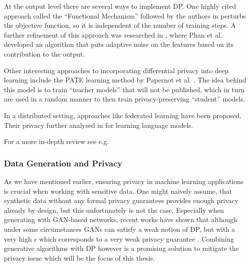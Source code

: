 At the output level there are several ways to implement DP. One highly cited approach called the ``Functional Mechanism'' followed by the authors in \parencite{zhang2012functional} perturbs the objective function, so it is independent of the number of training steps. A further refinement of this approach was researched in \parencite{adlm2017}, where Phan et al. developed an algorithm that puts adaptive noise on the features based on its contribution to the output.

Other interesting approaches to incorporating differential privacy into deep learning include the PATE learning method by Papernot et al. \parencite{papernot2017semisupervised}. The idea behind this model is to train ``teacher models'' that will not be published, which in turn are used in a random manner to then train privacy-preserving ``student'' models. 

In a distributed setting, approaches like federated learning \parencite{konečný2015federated,Mo2019EfficientAP} have been proposed. Their privacy further analysed in \parencite{mcmahan2018learning} for learning language models.

\vspace*{1em}
For a more in-depth review see e.g.\parencite{surrve_ppml,surv_ppml_2,wang2023differential}


\subsubsection*{Data Generation and Privacy}

As we have mentioned earlier, ensuring privacy in machine learning applications is crucial when working with sensitive data. One might naively assume, that synthetic data without any formal privacy guarantees provides enough privacy already by design, but this unfortunately is not the case. Especially when generating with GAN-based networks, recent works have shown that although under some circumstances GANs can satisfy a weak notion of DP, but with a very high $\epsilon$ which corresponds to a very weak privacy guarantee \parencite{lin2021privacy,stadler2022synthetic,jordon2022synthetic}. Combining generative algorithms with DP however is a promising solution to mitigate the privacy issue \parencite{bellovin2019privacy} which will be the focus of this thesis.


